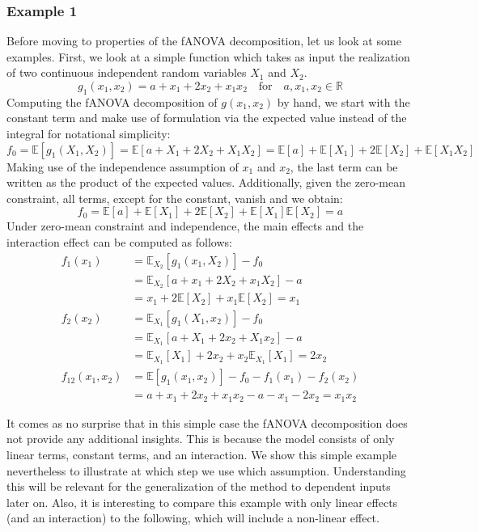 \subsubsection*{Example 1}
Before moving to properties of the fANOVA decomposition, let us look at some examples.
First, we look at a simple function which takes as input the realization of two continuous independent random variables $X_1$ and $X_2$.
\[
g_{1}(x_1, x_2) = a + x_1 + 2x_2 + x_1x_2 \quad \text{for} \quad a, x_1, x_2 \in \mathbb{R}
\]
Computing the fANOVA decomposition of $g(x_1, x_2)$ by hand, we start with the constant term and make use of formulation via the expected value instead of the integral for notational simplicity:
\[
f_0 = \mathbb{E}[g_{1}(X_1, X_2)] = \mathbb{E}[a + X_1 + 2X_2 + X_1X_2] = \mathbb{E}[a] + \mathbb{E}[X_1] + 2\mathbb{E}[X_2] + \mathbb{E}[X_1X_2]
\]
Making use of the independence assumption of $x_1$ and $x_2$, the last term can be written as the product of the expected values. Additionally, given the zero-mean constraint, all terms, except for the constant, vanish and we obtain:
\[
f_0 = \mathbb{E}[a] + \mathbb{E}[X_1] + 2\mathbb{E}[X_2] + \mathbb{E}[X_1]\mathbb{E}[X_2] = a
\]
Under zero-mean constraint and independence, the main effects and the interaction effect can be computed as follows:
\begin{align*}
f_1(x_1) &= \mathbb{E}_{X_2}[g_{1}(x_1, X_2)] - f_0 \\
&= \mathbb{E}_{X_2}[a + x_1 + 2X_2 + x_1X_2] - a \\
&= x_1 + 2\mathbb{E}[X_2] + x_1\mathbb{E}[X_2] = x_1\\
f_2(x_2) &= \mathbb{E}_{X_1}[g_{1}(X_1, x_2)] - f_0 \\
&= \mathbb{E}_{X_1}[a + X_1 + 2x_2 + X_1x_2] - a \\
&= \mathbb{E}_{X_1}[X_1] + 2x_2 + x_2\mathbb{E}_{X_1}[X_1] = 2x_2\\
f_{12}(x_1, x_2) &= \mathbb{E}[g_{1}(x_1, x_2)] - f_0 - f_1(x_1) - f_2(x_2) \\
&= a + x_1 + 2x_2 + x_1x_2 - a - x_1 - 2x_2 = x_1x_2
\end{align*}

It comes as no surprise that in this simple case the fANOVA decomposition does not provide any additional insights. This is because the model consists of only linear terms, constant terms, and an interaction. We show this simple example nevertheless to illustrate at which step we use which assumption. Understanding this will be relevant for the generalization of the method to dependent inputs later on. Also, it is interesting to compare this example with only linear effects (and an interaction) to the following, which will include a non-linear effect.\par


